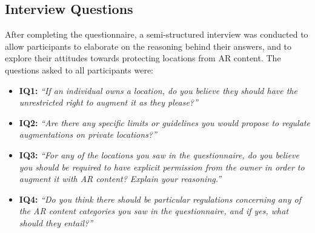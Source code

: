 \subsection{Interview Questions}
After completing the questionnaire, a semi-structured interview was conducted to allow participants to elaborate on the reasoning behind their answers, and to explore their attitudes towards protecting locations from AR content. 
The questions asked to all participants were: 
\begin{itemize}
    \item \textbf{IQ1:} \textit{``If an individual owns a location, do you believe they should have the unrestricted right to augment it as they please?'' }

    \item \textbf{IQ2:} \textit{``Are there any specific limits or guidelines you would propose to regulate augmentations on private locations?''}
 
    \item \textbf{IQ3:} \textit{``For any of the locations you saw in the questionnaire, do you believe you should be required to have explicit permission from the owner in order to augment it with AR content? Explain your reasoning.''}

    \item \textbf{IQ4:} \textit{``Do you think there should be particular regulations concerning any of the AR content categories you saw in the questionnaire, and if yes, what should they entail?''}
\end{itemize}







